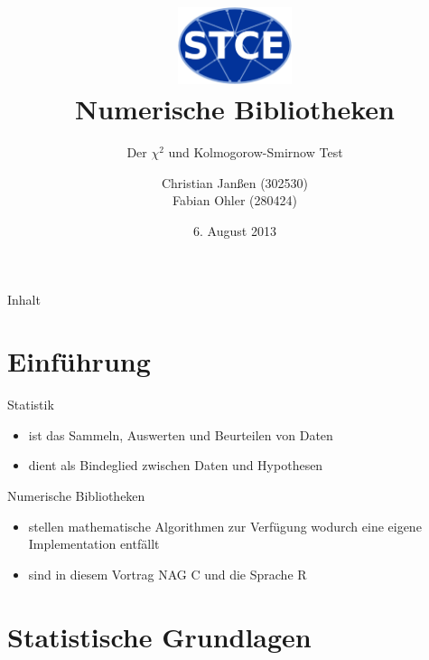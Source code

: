 \documentclass{beamer}
\begin{document}
\title{\centering
\includegraphics[width=0.25\textwidth]{./figures/logo.eps} \\ Numerische Bibliotheken}

\subtitle{Der $\chi^2$ und Kolmogorow-Smirnow Test}
\author{Christian Janßen (302530) \\ Fabian Ohler (280424) }
\date{6. August 2013}
\frame[plain]{\titlepage}

\begin{frame}{Inhalt}
	\tableofcontents
\end{frame}

\section{Einführung}
\begin{frame}{\insertsection}
		\begin{block}{Statistik}
			\begin{itemize}
			\item ist das Sammeln, Auswerten und Beurteilen von Daten
			\item dient als Bindeglied zwischen Daten und Hypothesen
			\end{itemize}
 		\end{block}
		\begin{block}{Numerische Bibliotheken}
			\begin{itemize}
			\item stellen mathematische Algorithmen zur Verfügung wodurch eine eigene Implementation entfällt
			\item sind in diesem Vortrag NAG C und die Sprache R
			\end{itemize}
 		\end{block}
\end{frame}

\section{Statistische Grundlagen}
\end{document}
